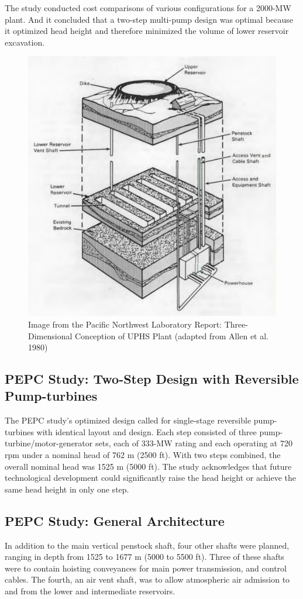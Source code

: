 \documentclass[hidelinks,12pt,a4paper]{article}
\begin{document}
The study conducted cost comparisons of various configurations for a 2000-MW plant. And it concluded that a two-step multi-pump design was optimal because it optimized head height and therefore minimized the volume of lower reservoir excavation. \cite{UndergroundPumpedHydroelectricStorage}


\begin{figure}[ht!]
    \centering
    \includegraphics[width=.75\textwidth]{pnl-report-diagram-2.png}
    \caption{Image from the Pacific Northwest Laboratory Report: Three-Dimensional Conception of UPHS Plant (adapted from Allen et al. 1980) \cite{UndergroundPumpedHydroelectricStorage}}
\end{figure}
\FloatBarrier


\subsection{PEPC Study: Two-Step Design with Reversible Pump-turbines}
The PEPC study's optimized design called for single-stage reversible pump-turbines with identical layout and design. Each step consisted of three pump-turbine/motor-generator sets, each of 333-MW rating and each operating at 720 rpm under a nominal head of 762 m (2500 ft). With two steps combined, the overall nominal head was 1525 m (5000 ft). The study acknowledges that future technological development could significantly raise the head height or achieve the same head height in only one step.

\subsection{PEPC Study: General Architecture}
In addition to the main vertical penstock shaft, four
other shafts were planned, ranging in depth from 1525 to 1677 m (5000
to 5500 ft). Three of these shafts were to contain hoisting conveyances for main power transmission, and control cables. The fourth, an air vent shaft, was to allow atmospheric air admission to and from the lower and intermediate reservoirs.
\end{document}
